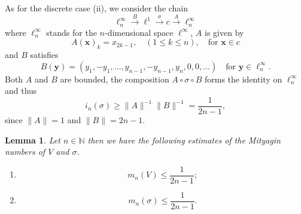 \documentclass[10pt,reqno]{amsart}
\def\N{\mathbb{N}}
\newtheorem{lemma}[theorem]{Lemma}
\numberwithin{equation}{section}
\let\oldendproof\endproof
\renewenvironment{proof}[1][\proofname]{%
  \oldproof[\bf #1]%
}{\oldendproof}
\def\li{{\ell^1}}
\def\linf{{c}}
\def\vx{\mathbf{x}}
\def\vy{\mathbf{y}}
\begin{document}
\begin{proof}
As for the discrete case (ii), we consider the chain
\def\linfn{{\ell^\infty_n}}
\begin{equation*}
	\linfn
		\xrightarrow {B} \li
		\xrightarrow {\sigma} \linf
		\xrightarrow {A} \linfn
\end{equation*}
where $\linfn$ stands for the $n$-dimensional space $\ell^\infty$,
$A$ is given by
\begin{equation*}
	A(\vx)_k = x_{2k-1},
		\quad (1\le k\le n),
		\quad\text{for $\vx\in\linf$}
\end{equation*}
and $B$ satisfies
\begin{equation*}
	B(\vy) = (y_1, -y_1,\ldots, y_{n-1}, -y_{n-1}, y_n,0,0,\dots)
		\quad\text{for $\vy\in\linfn$.}
\end{equation*}
Both $A$ and $B$ are bounded, the composition $A\circ\sigma\circ B$ forms the identity on $\linfn$
and thus
\begin{equation*}
	i_n(\sigma) \ge \| A \|^{-1} \| B \|^{-1} = \frac{1}{2n-1},
\end{equation*}
since $\|A\| = 1$ and $\|B\| = 2n-1$.
\end{proof}

\begin{lemma} \label{lemm:Mityagin}
Let $n\in\N$ then we have the following estimates of the Mityagin numbers of $V$ and $\sigma$.
\begin{enumerate}[\rm (i)]
\item 
\begin{equation*}
	m_n(V) \le \frac{1}{2n-1};
\end{equation*}
\item 
\begin{equation*}
	m_n(\sigma) \le \frac{1}{2n-1}.
\end{equation*}
\end{enumerate}
\end{lemma}
\end{document}
